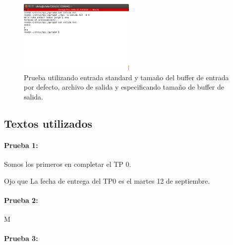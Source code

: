 \documentclass[a4paper]{article}
\begin{document}
\begin{figure}[!htp]
\begin{center}
\includegraphics[width=0.5\textwidth]{imagenes_casosDePrueba_tp1/pruebaStdin_salida_4.png}
\caption{Prueba utilizando entrada standard y tamaño del buffer de entrada por defecto, archivo de salida y especificando tamaño de buffer de salida.} \label{fig001}
\end{center}
\end{figure}

\pagebreak
\subsection{Textos utilizados}

\paragraph{Prueba 1:}

Somos los primeros en completar el TP 0.

Ojo que La fecha de entrega del TP0 es el martes 12 de septiembre.

\paragraph{Prueba 2:}

M

\paragraph{Prueba 3:} 
\end{document}
